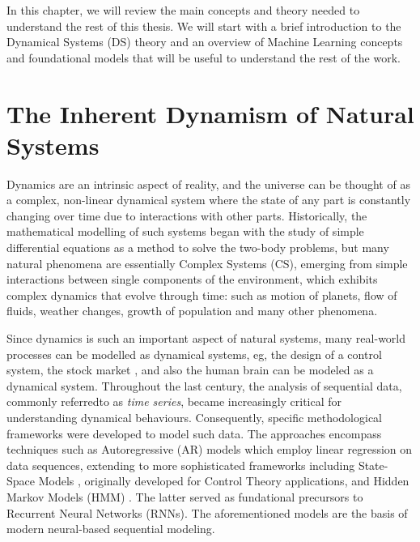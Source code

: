 
In this chapter, we will review the main concepts and theory needed to understand the rest of this thesis.
We will start with a brief introduction to the Dynamical Systems (DS) theory and an overview of Machine Learning
concepts and foundational models that will be useful to understand the rest of the work.

\section{The Inherent Dynamism of Natural Systems}
Dynamics are an intrinsic aspect of reality, and the universe can be thought of as a complex, non-linear dynamical system where the state of any part is constantly
changing over time due to interactions with other parts.
Historically, the mathematical modelling of such systems began with the study of simple differential equations as a method
to solve the two-body problems, but many natural phenomena are essentially Complex Systems (CS), emerging from simple interactions between single components of the 
environment, which exhibits complex dynamics that evolve through time:
such as motion of planets, flow of fluids, weather changes, growth of population \cite{renshaw1993modelling} and many other phenomena.\newline

Since dynamics is such an important aspect of natural systems, many real-world processes can be modelled as dynamical systems,
eg, the design of a control system, the stock market \cite{10.5555/322494}, and also the human brain \cite{RevModPhys.78.1213} can be modeled as a dynamical system.\newline
Throughout the last century, the analysis of sequential data, commonly referredto as \textit{time series}, became increasingly critical for understanding dynamical behaviours. Consequently, specific methodological frameworks were developed to model such data.
The approaches encompass techniques such as Autoregressive (AR) 
models which employ linear regression on data sequences,
extending to more sophisticated frameworks including State-Space Models \cite{kalman1960new}, originally developed for Control Theory applications,
 and Hidden Markov Models (HMM) \cite{baum1966statistical}. The latter served as fundational precursors to Recurrent Neural Networks \cite{ELMAN1990179} (RNNs).
 The aforementioned models are the basis of modern neural-based sequential modeling.\newline


